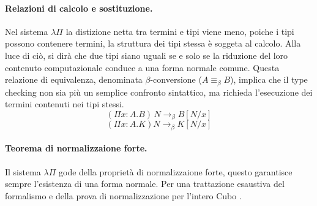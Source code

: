 \paragraph{Relazioni di calcolo e sostituzione.}
Nel sistema $\lambda \Pi$ la distizione netta tra termini e tipi viene meno, poiche i tipi possono contenere termini, la struttura dei tipi stessa è soggeta al calcolo. 
Alla luce di ciò, si dirà che due tipi siano uguali se e solo se la riduzione del loro contenuto computazionale conduce a una forma normale comune. 
Questa relazione di equivalenza, denominata $\beta$-conversione ($A \equiv_\beta B$), implica che il type checking non sia più un semplice confronto sintattico, 
ma richieda l'esecuzione dei termini contenuti nei tipi stessi.
\begin{equation}
    (\Pi x : A. B) \, N \to_\beta B[N/x]
    \label{eq:lp_type_application}
\end{equation}
\begin{equation}
    (\Pi x : A. K) N \to_\beta K[N/x]
    \label{eq:lp_kind_application}
\end{equation}

\paragraph{Teorema di normalizzaione forte.}
Il sistema $\lambda \Pi$ gode della proprietà di normalizzaione forte, questo garantisce sempre l'esistenza di una forma normale.
Per una trattazione esaustiva del formalismo e della prova di normalizzazione per l'intero Cubo \cite{barendregt1992}.

